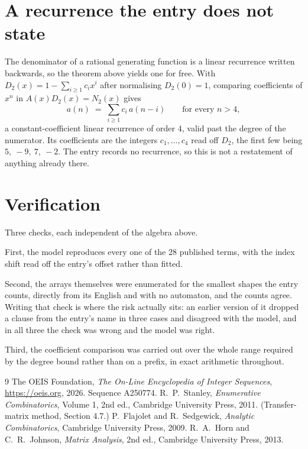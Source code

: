 \documentclass[11pt,a4paper]{article}
\theoremstyle{plain}
\theoremstyle{definition}
\begin{document}
\section{A recurrence the entry does not state}

The denominator of a rational generating function is a linear recurrence written backwards, so
the theorem above yields one for free. With $D_2(x)=1-\sum_{i\ge1}c_ix^i$ after normalising
$D_2(0)=1$, comparing coefficients of $x^n$ in $A(x)D_2(x)=N_2(x)$ gives
\[
a(n)\;=\;\sum_{i\ge1}c_i\,a(n-i)\qquad\text{for every }n>4,
\]
a constant-coefficient linear recurrence of order $4$, valid past the degree of the
numerator. Its coefficients are the integers $c_1,\dots,c_{4}$ read off $D_2$, the first few being $5,\ -9,\ 7,\ -2$. The entry records no recurrence, so this is not a restatement of anything
already there.

\section{Verification}

Three checks, each independent of the algebra above.

First, the model reproduces every one of the $28$ published terms, with the index shift
read off the entry's offset rather than fitted.

Second, the arrays themselves were enumerated for the smallest shapes the entry counts,
directly from its English and with no automaton, and the counts agree. Writing that check is
where the risk actually sits: an earlier version of it dropped a clause from the entry's name
in three cases and disagreed with the model, and in all three the check was wrong and the model
was right.

Third, the coefficient comparison was carried out over the whole range required by the degree
bound rather than on a prefix, in exact arithmetic throughout.

\begin{thebibliography}{9}
 The OEIS Foundation, \emph{The On-Line Encyclopedia of Integer
Sequences}, \url{https://oeis.org}, 2026. Sequence A250774.
 R.~P.~Stanley, \emph{Enumerative Combinatorics}, Volume 1, 2nd ed.,
Cambridge University Press, 2011. (Transfer-matrix method, Section 4.7.)
 P.~Flajolet and R.~Sedgewick, \emph{Analytic Combinatorics}, Cambridge
University Press, 2009.
 R.~A.~Horn and C.~R.~Johnson, \emph{Matrix Analysis}, 2nd ed., Cambridge
University Press, 2013.
\end{thebibliography}
\end{document}
